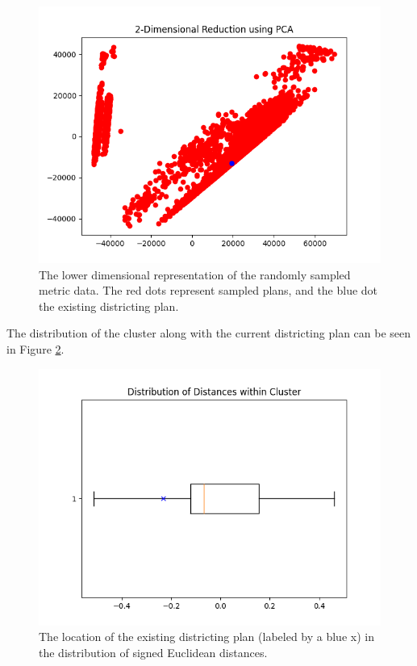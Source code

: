 \documentclass[a4paper]{article}
\theoremstyle{definition}
\begin{document}
	\begin{figure}[h]
		\centering
		\includegraphics[scale=.4]{2Dvisual.png}
		\caption{The lower dimensional representation of the randomly sampled metric data. The red dots represent sampled plans, and the blue dot the existing districting plan.}\label{fig1}
	\end{figure}

	The distribution of the cluster along with the current districting plan can be seen in Figure \ref{fig2}.
	
	\begin{figure}[h]
		\centering
		\includegraphics[scale=.4]{boxplot.png}
		\caption{The location of the existing districting plan (labeled by a blue x) in the distribution of signed Euclidean distances.}\label{fig2}
	\end{figure}
\end{document}
